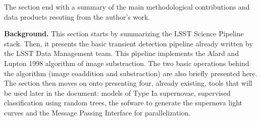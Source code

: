 \documentclass{article}
\begin{document}
The section end with a summary of the main methodological contributions and data products resuting from the author's work. 

{\bf Background.} This section starts by summarizing the LSST Science Pipeline stack. Then, it presents the basic transient detection pipeline already written by the LSST Data Management team.
This pipeline implements the Alard and Lupton 1998 algorithm of image substraction. The two basic operations behind the algorithm (image coaddition and substraction) are also briefly presented here. The section then moves on onto presenting four, already existing,  tools that will be used later in the document: models of Type Ia supernovae, supervised classification using random trees, the sofware to generate the supernova light curves and the Message Passing Interface for parallelization.
\end{document}
